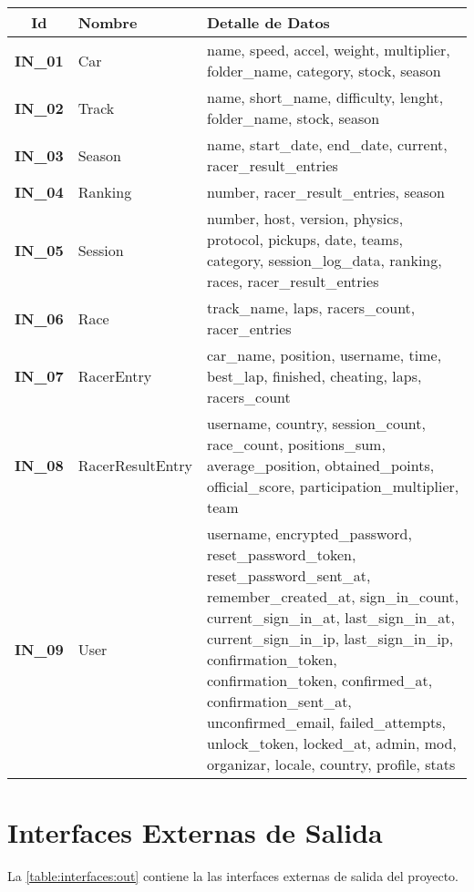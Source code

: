 \begin{center}
	\begin{tabular}{ | c | p{3.5cm} | p{10cm} |}
		\hline
		\textbf{Id} & {\textbf{Nombre}} & {\textbf{Detalle de Datos}} \\ \hline
		{\textbf{IN\_01}} & Car & name, speed, accel, weight, multiplier, folder\_name, category, stock, season \\ \hline
		{\textbf{IN\_02}} & Track &  name, short\_name, difficulty, lenght, folder\_name, stock, season \\ \hline
		{\textbf{IN\_03}} & Season & name, start\_date, end\_date, current, racer\_result\_entries \\ \hline
		{\textbf{IN\_04}} & Ranking & number, racer\_result\_entries, season \\ \hline
		{\textbf{IN\_05}} & Session & number, host, version, physics, protocol, pickups, date, teams, category, session\_log\_data, ranking, races, racer\_result\_entries \\ \hline
		{\textbf{IN\_06}} & Race & track\_name, laps, racers\_count, racer\_entries \\ \hline
		{\textbf{IN\_07}} & RacerEntry & car\_name, position, username, time, best\_lap, finished, cheating, laps, racers\_count\\ \hline
		{\textbf{IN\_08}} & RacerResultEntry & username, country, session\_count, race\_count, positions\_sum, average\_position, obtained\_points, official\_score, participation\_multiplier, team \\ \hline
		{\textbf{IN\_09}} & User & username, encrypted\_password, reset\_password\_token, reset\_password\_sent\_at, remember\_created\_at, sign\_in\_count, current\_sign\_in\_at, last\_sign\_in\_at, current\_sign\_in\_ip, last\_sign\_in\_ip, confirmation\_token, confirmation\_token, confirmed\_at, confirmation\_sent\_at, unconfirmed\_email, failed\_attempts, unlock\_token, locked\_at, admin, mod, organizar, locale, country, profile, stats \\ \hline
	\end{tabular}
  
    \label{table:interfaces:in}
\end{center}

\newpage

\section{Interfaces Externas de Salida}
La \autoref{table:interfaces:out} contiene la las interfaces externas de salida del proyecto.

